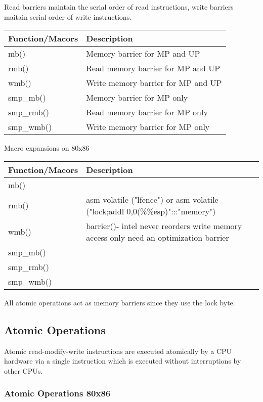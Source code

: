 \documentclass{article}
\begin{document}
Read barriers maintain the serial order of read instructions, write
barriers maitain serial order of write instructions.

\begin{center}
  \begin{tabular}{ l | l }    
    \hline
    Function/Macors & Description \\ \hline
    mb() & Memory barrier for MP and UP \\ 
    rmb() & Read memory barrier for MP and UP  \\ 
    wmb() &  Write memory barrier for MP and UP \\
    smp\_mb() &  Memory barrier for MP only \\
    smp\_rmb() &  Read memory barrier for MP only \\
    smp\_wmb() &  Write memory barrier for MP only \\
    \hline
  \end{tabular}
\end{center}
  Macro expansions on  80x86


  \begin{tabular}{ l | p{5 cm} }    
    \hline
    Function/Macors & Description \\ \hline
    mb() &  \\ 
    rmb() & asm volatile ("lfence") or asm volatile ("lock;addl 0,0(\%\%esp)":::"memory")  \\ 
    wmb() & barrier()- intel never reorders write memory access only need an optimization barrier  \\
    smp\_mb() &   \\
    smp\_rmb() &  \\
    smp\_wmb() &  \\
    \hline
  \end{tabular}


All atomic operations act as memory barriers since they use the lock byte.

\subsection{Atomic Operations}

Atomic read-modify-write instructions are executed atomically by a CPU
hardware via a single instruction which is executed without
interruptions by other CPUs.

\subsubsection{Atomic Operations 80x86}
\end{document}
